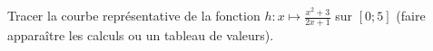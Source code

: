 \documentclass[12pt]{article}
\begin{document}
  \begin{exercice}
    Tracer la courbe représentative de la fonction $h:x\mapsto
    \frac{x^2+3}{2x+1}$ sur $\left[0; 5\right]$ (faire apparaître les calculs
    ou un tableau de valeurs).


  \end{exercice}
\end{document}
